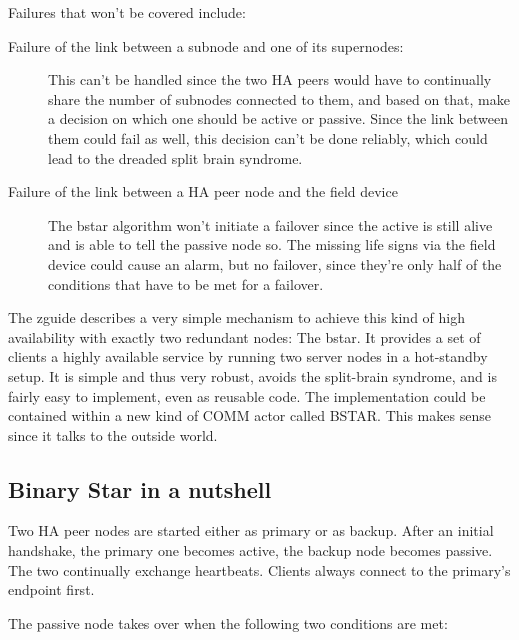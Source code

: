 Failures that won't be covered include:
\begin{description}
	\item [Failure of the link between a subnode and one of its supernodes:]

		This can't be handled since the two HA peers would have to
		continually share the number of subnodes connected to them, and
		based on that, make a decision on which one should be active or
		passive. Since the link between them could fail as well, this
		decision can't be done reliably, which could lead to the
		dreaded split brain syndrome.


	\item [Failure of the link between a HA peer node and the field device]
		The \gls{bstar} algorithm won't initiate a failover since the
		active is still alive and is able to tell the passive node so.
		The missing life signs via the field device could cause an alarm, but no
		failover, since they're only half of the conditions that have
		to be met for a failover.
\end{description}

The \gls{zguide} describes a very simple mechanism to achieve this kind of high
availability with exactly two redundant nodes: The \gls{bstar}. It
provides a set of clients a highly available service by running two server
nodes in a hot-standby setup. It is simple and thus very robust, avoids the
split-brain syndrome, and is fairly easy to implement, even as reusable
code. The implementation could be contained within a new kind of COMM actor
called BSTAR. This makes sense since it talks to the outside world.


\subsection{Binary Star in a nutshell}
Two HA peer nodes are started either as primary or as backup. After an initial
handshake, the primary one becomes active, the backup node becomes passive. The
two continually exchange heartbeats. Clients always connect to the primary's endpoint first.

The passive node takes over when the following two conditions are met:

